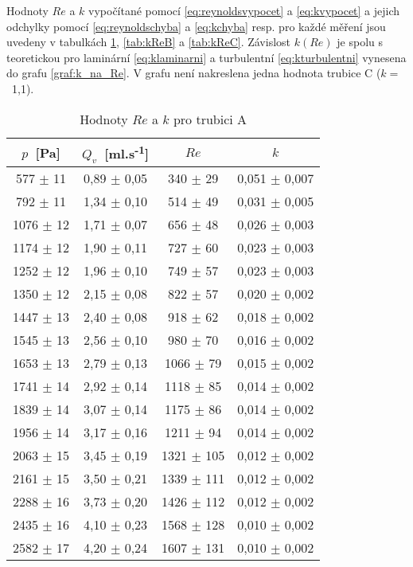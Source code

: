 Hodnoty $Re$ a $k$ vypočítané pomocí \eqref{eq:reynoldsvypocet} a \eqref{eq:kvypocet} a jejich odchylky pomocí \eqref{eq:reynoldschyba} a \eqref{eq:kchyba} resp. pro každé měření jsou uvedeny v tabulkách \ref{tab:kReA}, \ref{tab:kReB} a \ref{tab:kReC}. Závislost $k(Re)$ je spolu s teoretickou pro laminární \eqref{eq:klaminarni} a turbulentní \eqref{eq:kturbulentni} vynesena do grafu \ref{graf:k_na_Re}. V grafu není nakreslena jedna hodnota trubice C ($k =$~1,1).

\begin{table}[htbp]
\centering
\begin{tabular}{|cccc|}
\hline 
$p$~[Pa]  &  $Q_v$~[ml.s\textsuperscript{-1}]  & $Re$ & $k$ \\ \hline
 577 $\pm$ 11 & 0,89 $\pm$ 0,05 & 340 $\pm$ 29 & 0,051 $\pm$ 0,007\\ 
 792 $\pm$ 11 & 1,34 $\pm$ 0,10 & 514 $\pm$ 49 & 0,031 $\pm$ 0,005\\ 
 1076 $\pm$ 12 & 1,71 $\pm$ 0,07 & 656 $\pm$ 48 & 0,026 $\pm$ 0,003\\ 
 1174 $\pm$ 12 & 1,90 $\pm$ 0,11 & 727 $\pm$ 60 & 0,023 $\pm$ 0,003\\ 
 1252 $\pm$ 12 & 1,96 $\pm$ 0,10 & 749 $\pm$ 57 & 0,023 $\pm$ 0,003\\ 
 1350 $\pm$ 12 & 2,15 $\pm$ 0,08 & 822 $\pm$ 57 & 0,020 $\pm$ 0,002\\ 
 1447 $\pm$ 13 & 2,40 $\pm$ 0,08 & 918 $\pm$ 62 & 0,018 $\pm$ 0,002\\ 
 1545 $\pm$ 13 & 2,56 $\pm$ 0,10 & 980 $\pm$ 70 & 0,016 $\pm$ 0,002\\ 
 1653 $\pm$ 13 & 2,79 $\pm$ 0,13 & 1066 $\pm$ 79 & 0,015 $\pm$ 0,002\\ 
 1741 $\pm$ 14 & 2,92 $\pm$ 0,14 & 1118 $\pm$ 85 & 0,014 $\pm$ 0,002\\ 
 1839 $\pm$ 14 & 3,07 $\pm$ 0,14 & 1175 $\pm$ 86 & 0,014 $\pm$ 0,002\\ 
 1956 $\pm$ 14 & 3,17 $\pm$ 0,16 & 1211 $\pm$ 94 & 0,014 $\pm$ 0,002\\ 
 2063 $\pm$ 15 & 3,45 $\pm$ 0,19 & 1321 $\pm$ 105 & 0,012 $\pm$ 0,002\\ 
 2161 $\pm$ 15 & 3,50 $\pm$ 0,21 & 1339 $\pm$ 111 & 0,012 $\pm$ 0,002\\ 
 2288 $\pm$ 16 & 3,73 $\pm$ 0,20 & 1426 $\pm$ 112 & 0,012 $\pm$ 0,002\\ 
 2435 $\pm$ 16 & 4,10 $\pm$ 0,23 & 1568 $\pm$ 128 & 0,010 $\pm$ 0,002\\ 
 2582 $\pm$ 17 & 4,20 $\pm$ 0,24 & 1607 $\pm$ 131 & 0,010 $\pm$ 0,002\\
\hline
\end{tabular}
\caption{Hodnoty $Re$ a $k$ pro trubici A}
\label{tab:kReA}
\end{table}

